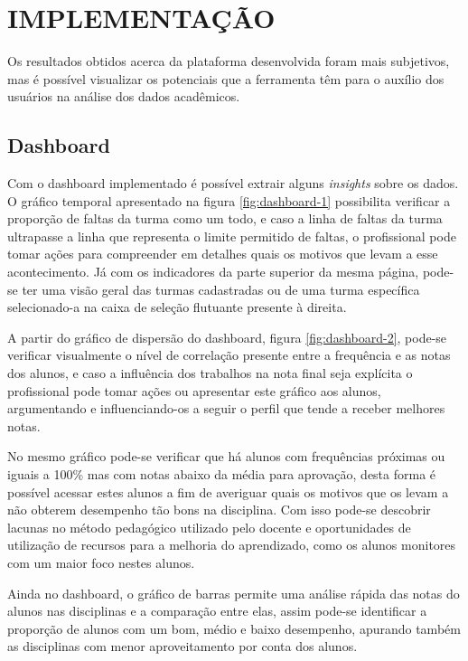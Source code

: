 \section{IMPLEMENTAÇÃO}

Os resultados obtidos acerca da plataforma desenvolvida foram mais subjetivos, mas é possível visualizar os potenciais que a ferramenta têm para o auxílio dos usuários na análise dos dados acadêmicos.

\subsection{Dashboard}

Com o dashboard implementado é possível extrair alguns \textit{insights} sobre os dados. 
O gráfico temporal apresentado na figura \ref{fig:dashboard-1} possibilita verificar a proporção de faltas da turma como um todo, e caso a linha de faltas da turma ultrapasse a linha que representa o limite permitido de faltas, o profissional pode tomar ações para compreender em detalhes quais os motivos que levam a esse acontecimento.
Já com os indicadores da parte superior da mesma página, pode-se ter uma visão geral das turmas cadastradas ou de uma turma específica selecionado-a na caixa de seleção flutuante presente à direita.

A partir do gráfico de dispersão do dashboard, figura \ref{fig:dashboard-2}, pode-se verificar visualmente o nível de correlação presente entre a frequência e as notas dos alunos, e caso a influência dos trabalhos na nota final seja explícita o profissional pode tomar ações ou apresentar este gráfico aos alunos, argumentando e influenciando-os a seguir o perfil que tende a receber melhores notas.

No mesmo gráfico pode-se verificar que há alunos com frequências próximas ou iguais a 100\% mas com notas abaixo da média para aprovação, desta forma é possível acessar estes alunos a fim de averiguar quais os motivos que os levam a não obterem desempenho tão bons na disciplina.
Com isso pode-se descobrir lacunas no método pedagógico utilizado pelo docente e oportunidades de utilização de recursos para a melhoria do aprendizado, como os alunos monitores com um maior foco nestes alunos.

Ainda no dashboard, o gráfico de barras permite uma análise rápida das notas do alunos nas disciplinas e a comparação entre elas, assim pode-se identificar a proporção de alunos com um bom, médio e baixo desempenho, apurando também as disciplinas com menor aproveitamento por conta dos alunos.

